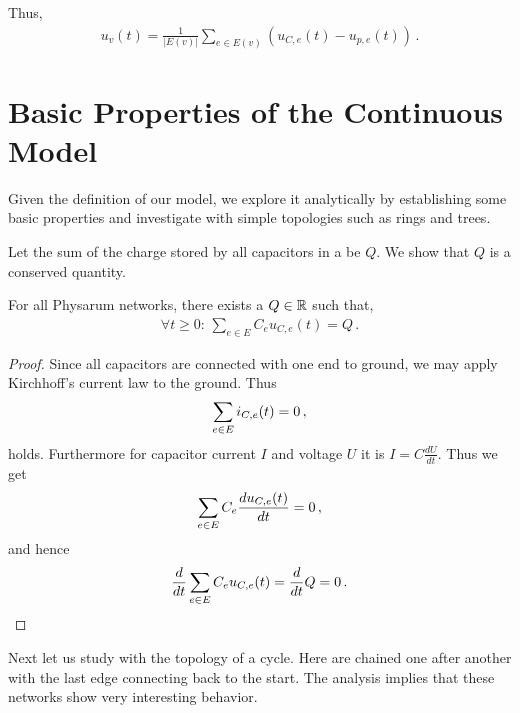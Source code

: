 Thus,
\begin{align}
  u_v(t) = \frac{1}{|E(v)|}\sum_{e \in E(v)}(u_{C,e}(t)-u_{p,e}(t))\,.\label{eq:uv}
\end{align}


\section{Basic Properties of the Continuous Model}\label{sec:basic_cont}

  Given the definition of our model, we explore it analytically by establishing some basic properties and investigate \Pns with simple topologies such as rings and trees.

  Let the sum of the charge stored by all capacitors in a \Pn be $Q$. We show that $Q$ is a conserved quantity.

\begin{lem}\label{lem:inv_cont}
For all Physarum networks, there exists a $Q \in \mathbb{R}$ such that,
\begin{align}
\forall t\ge 0:\,\sum_{e \in E}C_e u_{C,e}(t) = Q\,.
\end{align}
\end{lem}

\begin{proof}
Since all capacitors are connected with one end to ground, we may apply Kirchhoff's current law to the ground.
Thus  
\begin{align}
\sum_{e \in E}i_{C,e}(t) = 0\,,\notag
\end{align}
holds. Furthermore for capacitor current $I$ and voltage $U$ it is $I= C \frac{dU}{dt}$. Thus we get
\begin{align}
\sum_{e \in E}C_e\frac{du_{C,e}(t)}{dt} = 0\,,\notag
\end{align}
and hence
\begin{align}
\frac{d}{dt}\sum_{e \in E}C_eu_{C,e}(t) = \frac{d}{dt} Q = 0\,.\notag
\end{align}
\end{proof}

Next let us study \Pns with the topology of a cycle. Here \Pes are chained one after another with the last edge connecting back to the start. The analysis implies that these networks show very interesting behavior. 

